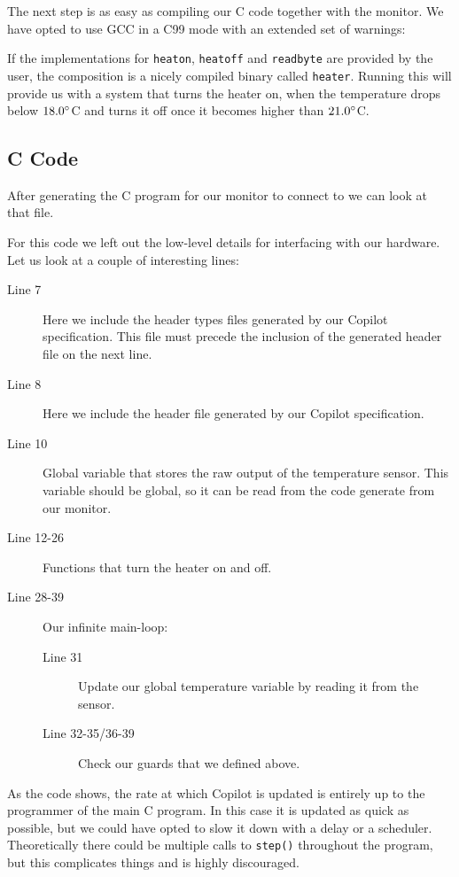 The next step is as easy as compiling our C code together with the monitor. We
have opted to use GCC in a C99 mode with an extended set of warnings:

If the implementations for \texttt{heaton}, \texttt{heatoff} and
\texttt{readbyte} are provided by the user, the composition is a nicely compiled
binary called \texttt{heater}. Running this will provide us with a system that
turns the heater on, when the temperature drops below $18.0\degree$C and turns
it off once it becomes higher than $21.0\degree$C.

\subsection{C Code}
After generating the C program for our monitor to connect to we can look at that file.



For this code we left out the low-level details for interfacing with our
hardware. Let us look at a couple of interesting lines:

\begin{description}
  \item[Line 7] Here we include the header types files generated by our Copilot
  specification. This file must precede the inclusion of the generated header
  file on the next line. 
  \item[Line 8] Here we include the header file generated by our Copilot
  specification.
  \item[Line 10] Global variable that stores the raw output of the temperature
  sensor. This variable should be global, so it can be read from the code
  generate from our monitor.
  \item[Line 12-26] Functions that turn the heater on and  off.
  \item[Line 28-39] Our infinite main-loop:
    \begin{description}
      \item[Line 31] Update our global temperature variable by reading it from
      the sensor.
      \item[Line 32-35/36-39] Check our guards that we defined above.
    \end{description}
\end{description}

As the code shows, the rate at which Copilot is updated is entirely up to the
programmer of the main C program. In this case it is updated as quick as
possible, but we could have opted to slow it down with a delay or a scheduler.
Theoretically there could be multiple calls to \texttt{step()} throughout the
program, but this complicates things and is highly discouraged.


